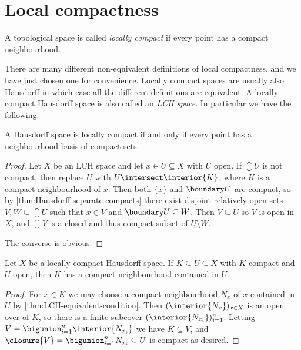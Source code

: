 \documentclass[article, a4paper, 11pt, oneside]{memoir}
\numberwithin{equation}{chapter}
\begin{document}
\section{Local compactness}

\begin{definition}
    A topological space is called \emph{locally compact} if every point has a compact neighbourhood.
\end{definition}
%
There are many different non-equivalent definitions of local compactness, and we have just chosen one for convenience. Locally compact spaces are usually also Hausdorff in which case all the different definitions are equivalent. A locally compact Hausdorff space is also called an \emph{LCH space}. In particular we have the following:

\begin{proposition}
    \label{thm:LCH-equivalent-condition}
    A Hausdorff space is locally compact if and only if every point has a neighbourhood basis of compact sets.
\end{proposition}

\begin{proof}
    Let $X$ be an LCH space and let $x \in U \subseteq X$ with $U$ open. If $\closure{U}$ is not compact, then replace $U$ with $U \intersect \interior{K}$, where $K$ is a compact neighbourhood of $x$. Then both $\{x\}$ and $\boundary U$ are compact, so by \cref{thm:Hausdorff-separate-compacts} there exist disjoint relatively open sets $V, W \subseteq \closure{U}$ such that $x \in V$ and $\boundary U \subseteq W$. Then $V \subseteq U$ so $V$ is open in $X$, and $\closure{V}$ is a closed and thus compact subset of $U \setminus W$.

    The converse is obvious.
\end{proof}


\begin{corollary}
    \label{thm:LCH-compact-set-has-compact-nhood}
    Let $X$ be a locally compact Hausdorff space. If $K \subseteq U \subseteq X$ with $K$ compact and $U$ open, then $K$ has a compact neighbourhood contained in $U$.
\end{corollary}

\begin{proof}
    For $x \in K$ we may choose a compact neighbourhood $N_x$ of $x$ contained in $U$ by \cref{thm:LCH-equivalent-condition}. Then $(\interior{N_x})_{x \in X}$ is an open over of $K$, so there is a finite subcover $(\interior{N_{x_i}})_{i=1}^n$. Letting $V = \bigunion_{i=1}^n \interior{N_{x_i}}$ we have $K \subseteq V$, and $\closure{V} = \bigunion_{i=1}^n N_{x_i} \subseteq U$ is compact as desired.
\end{proof}
\end{document}
